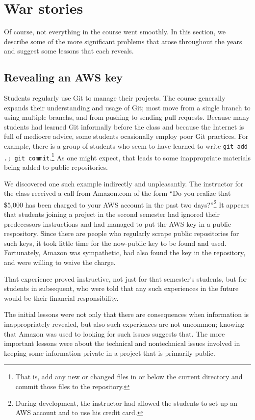\section{War stories}

Of course, not everything in the course went smoothly.  In this section,
we describe some of the more significant problems that arose throughout
the years and suggest some lessons that each reveals.

\subsection{Revealing an AWS key}

Students regularly use Git to manage their projects.  The course
generally expands their understanding and usage of Git; most move
from a single branch to using multiple branchs, and from pushing
to sending pull requests.  Because many students had learned Git
informally before the class and because the Internet is full of
mediocre advice, some students ocasionally employ poor Git practices.
For example, there is a group of students who seem to have learned
to write \texttt{git add .; git commit}.\footnote{That is, add any
new or changed files in or below the current directory and commit
those files to the repository.}  As one might expect, that leads
to some inappropriate materials being added to public repositories.

We discovered one such example indirectly and unpleasantly.  The
instructor for the class received a call from Amazon.com of the
form ``Do you realize that \$5,000 has been charged to your AWS
account in the past two days?''\footnote{During development, the
instructor had allowed the students to set up an AWS account and
to use his credit card.}  It appears that students joining a project
in the second semester had ignored their predecessors instructions
and had managed to put the AWS key in a public respository.  Since
there are people who regularly scrape public repositories for such
keys, it took little time for the now-public key to be found and
used.  Fortunately, Amazon was sympathetic, had also found the
key in the repository, and were willing to waive the charge.

That experience proved instructive, not just for that semester's
students, but for students in subsequent, who were told that any
such experiences in the future would be their financial responsibility.

The initial lessons were not only that there are consequences when
information is inappropriately revealed, but also such experiences
are not uncommon; knowing that Amazon was used to looking for such
issues suggests that.  The more important lessons were about the
technical and nontechnical issues involved in keeping some information
private in a project that is primarily public.

